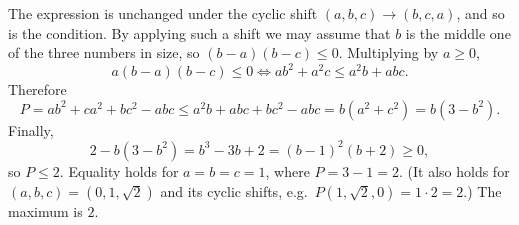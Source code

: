 The expression is unchanged under the cyclic shift $(a,b,c)\to(b,c,a)$, and so is the condition. By applying such a shift we may assume that $b$ is the middle one of the three numbers in size, so $(b-a)(b-c)\le0$. Multiplying by $a\ge0$,
\[
a(b-a)(b-c)\le0\iff ab^2+a^2c\le a^2b+abc .
\]
Therefore
\[
P=ab^2+ca^2+bc^2-abc\le a^2b+abc+bc^2-abc=b(a^2+c^2)=b(3-b^2).
\]
Finally,
\[
2-b(3-b^2)=b^3-3b+2=(b-1)^2(b+2)\ge0 ,
\]
so $P\le2$. Equality holds for $a=b=c=1$, where $P=3-1=2$. (It also holds for $(a,b,c)=(0,1,\sqrt2)$ and its cyclic shifts, e.g.\ $P(1,\sqrt2,0)=1\cdot2=2$.) The maximum is $\boxed{2}$.
